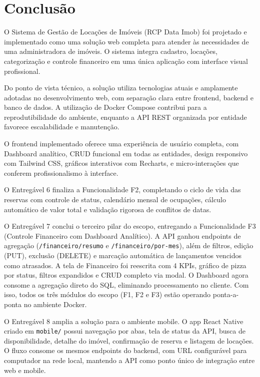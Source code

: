 \documentclass[12pt, a4paper]{article}
\begin{document}
\section{Conclusão}

O Sistema de Gestão de Locações de Imóveis (RCP Data Imob) foi projetado e implementado como uma solução web completa para atender às necessidades de uma administradora de imóveis. O sistema integra cadastro, locações, categorização e controle financeiro em uma única aplicação com interface visual profissional.

Do ponto de vista técnico, a solução utiliza tecnologias atuais e amplamente adotadas no desenvolvimento web, com separação clara entre frontend, backend e banco de dados. A utilização de Docker Compose contribui para a reprodutibilidade do ambiente, enquanto a API REST organizada por entidade favorece escalabilidade e manutenção.

O frontend implementado oferece uma experiência de usuário completa, com Dashboard analítico, CRUD funcional em todas as entidades, design responsivo com Tailwind CSS, gráficos interativos com Recharts, e micro-interações que conferem profissionalismo à interface.

O Entregável 6 finaliza a Funcionalidade F2, completando o ciclo de vida das reservas com controle de status, calendário mensal de ocupações, cálculo automático de valor total e validação rigorosa de conflitos de datas.

O Entregável 7 conclui o terceiro pilar do escopo, entregando a Funcionalidade F3 (Controle Financeiro com Dashboard Analítico). A API ganhou endpoints de agregação (\texttt{/financeiro/resumo} e \texttt{/financeiro/por-mes}), além de filtros, edição (PUT), exclusão (DELETE) e marcação automática de lançamentos vencidos como atrasados. A tela de Financeiro foi reescrita com 4 KPIs, gráfico de pizza por status, filtros expandidos e CRUD completo via modal. O Dashboard agora consome a agregação direto do SQL, eliminando processamento no cliente. Com isso, todos os três módulos do escopo (F1, F2 e F3) estão operando ponta-a-ponta no ambiente Docker.

O Entregável 8 amplia a solução para o ambiente mobile. O app React Native criado em \texttt{mobile/} possui navegação por abas, tela de status da API, busca de disponibilidade, detalhe do imóvel, confirmação de reserva e listagem de locações. O fluxo consome os mesmos endpoints do backend, com URL configurável para computador na rede local, mantendo a API como ponto único de integração entre web e mobile.
\end{document}
